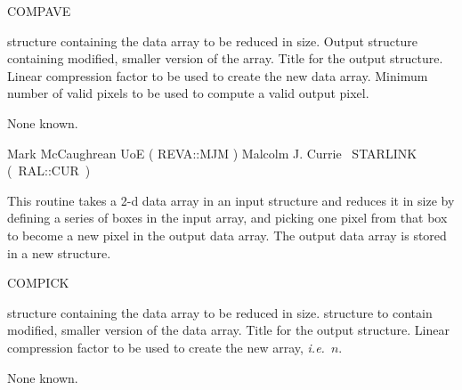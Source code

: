 {\begin{manroutinedescription}
  COMPAVE

\begin{manparametertable}
  {} structure containing the data array to be reduced in
  size.
  Output {} structure containing modified, smaller version
  of the array.
  Title for the output {} structure. \mbox{}
  Linear compression factor to be used to create the new data
  array.
  Minimum number of valid pixels to be used to compute a valid
  output pixel. \mbox{\mantt [\%COMPRESS]}
\end{manparametertable}
  None known.

  Mark McCaughrean UoE ( {\mantt REVA}::{\mantt MJM} )
  Malcolm J. Currie ~STARLINK \mbox{( {\mantt RAL}::{\mantt CUR} )}
\end{manroutinedescription}

\begin{manroutinedescription}
  This routine takes a 2-d data array in an input {} structure
  and reduces it in size by defining a series of boxes in the input
  array, and picking one pixel from that box to become a new pixel
  in the output data array. The output data array is stored in a
  new {} structure.

  COMPICK

\begin{manparametertable}
  {} structure containing the data array to be reduced in
  size.
  {} structure to contain modified, smaller version of the
  data array.
  Title for the output {} structure. \mbox{}
  Linear compression factor to be used to create the new array,
  {\it i.e.}\ {$n$}.
\end{manparametertable}
  None known.


\end{manroutinedescription}}
